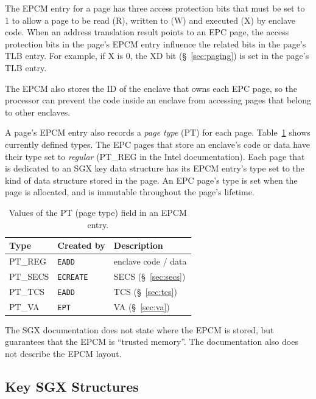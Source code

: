 
The EPCM entry for a page has three access protection bits that must be set to
1 to allow a page to be read (R), written to (W) and executed (X) by enclave
code. When an address translation result points to an EPC page, the access
protection bits in the page's EPCM entry influence the related bits in the
page's TLB entry. For example, if X is 0, the XD bit (\S~\ref{sec:paging}) is
set in the page's TLB entry.

The EPCM also stores the ID of the enclave that owns each EPC page, so the
processor can prevent the code inside an enclave from accessing pages that
belong to other enclaves.

A page's EPCM entry also records a \textit{page type} (PT) for each page.
Table~\ref{fig:pt_values} shows currently defined types. The EPC pages that
store an enclave's code or data have their type set to \textit{regular}
(PT\_REG in the Intel documentation). Each page that is dedicated to an SGX key
data structure has its EPCM entry's type set to the kind of data structure
stored in the page. An EPC page's type is set when the page is allocated, and
is immutable throughout the page's lifetime.

\begin{table}[hbt]
  \centering
  \begin{tabularx}{\columnwidth}{| l | l | X |}
  \hline
  \textbf{Type} & \textbf{Created by} & \textbf{Description}\\
  \hline
  PT\_REG & \texttt{EADD} & enclave code / data \\
  \hline
  PT\_SECS & \texttt{ECREATE} & SECS (\S~\ref{sec:secs}) \\
  \hline
  PT\_TCS & \texttt{EADD} & TCS (\S~\ref{sec:tcs}) \\
  \hline
  PT\_VA & \texttt{EPT} & VA (\S~\ref{sec:va}) \\
  \hline
  \end{tabularx}
  \caption{Values of the PT (page type) field in an EPCM entry.}
  \label{fig:pt_values}
\end{table}

The SGX documentation does not state where the EPCM is stored, but guarantees
that the EPCM is ``trusted memory''. The documentation also does not describe
the EPCM layout.


\subsection{Key SGX Structures}
\label{sec:key_structures}

